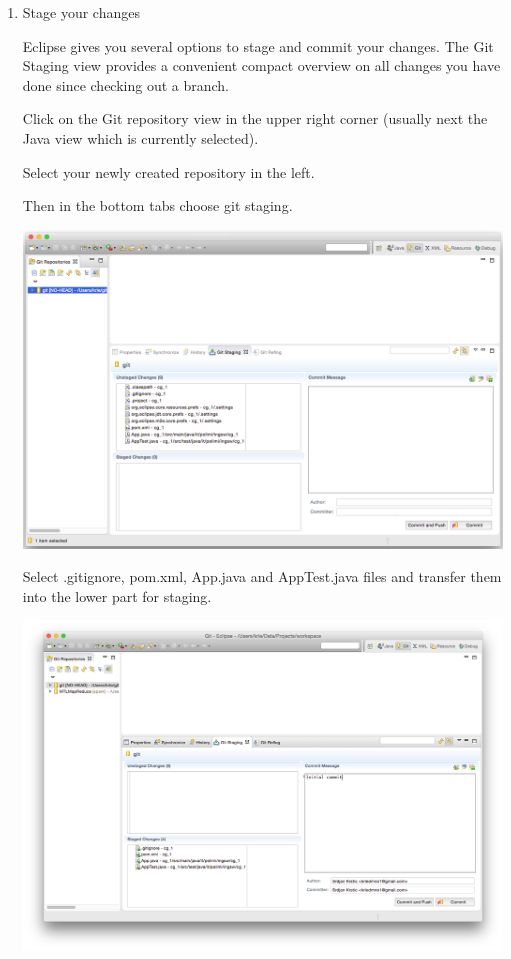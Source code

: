 \documentclass{article}
\begin{document}
\begin{enumerate}
\item Stage your changes

Eclipse gives you several options to stage and commit your
changes. The Git Staging view provides a convenient compact overview
on all changes you have done since checking out a branch.



Click on the Git repository view in the upper right corner (usually
next the Java view which is currently selected).

Select your newly created repository in the left.

Then in the bottom tabs choose git staging.

\begin{center}
\includegraphics[scale=0.33]{figures/s7.png}
\end{center}

Select .gitignore, pom.xml, App.java and AppTest.java files and
transfer them into the lower part for staging.

\begin{center}
\includegraphics[scale=0.33]{figures/s8.png}
\end{center}


\end{enumerate}
\end{document}
